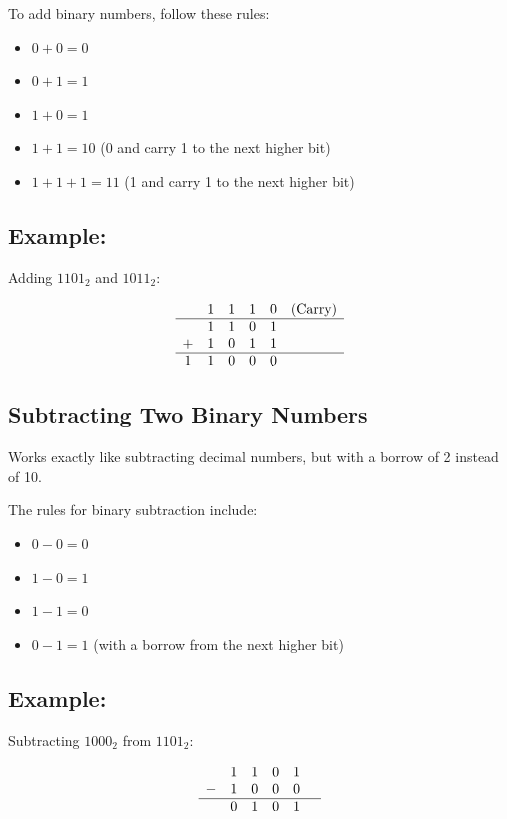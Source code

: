 \documentclass[12pt,openany, tikz,border=10pt]{book}
\begin{document}
	To add binary numbers, follow these rules:
	\begin{itemize}
		\item[] \(0 + 0 = 0\)
		\item[] \(0 + 1 = 1\)
		\item[] \(1 + 0 = 1\)
		\item[] \(1 + 1 = 10\) (0 and carry 1 to the next higher bit)
		\item[] \(1 + 1 + 1 = 11\) (1 and carry 1 to the next higher bit)
	\end{itemize}
	
	\subsection*{Example:}
	
	Adding \(1101_2\) and \(1011_2\):
	
	\[
		\begin{array}{cccccc}
			  & 1 & 1 & 1 & 0 & \text{(Carry)} \\
			\hline
			  & 1 & 1 & 0 & 1 &                \\
			+ & 1 & 0 & 1 & 1 &                \\
			\hline
			1 & 1 & 0 & 0 & 0 &                \\
		\end{array}
	\]
	
	
	\newpage
	\subsection{Subtracting Two Binary Numbers}
	Works exactly like subtracting decimal numbers, but with a borrow of 2 instead of 10.
	
	The rules for binary subtraction include:
	\begin{itemize}
		\item[] \(0 - 0 = 0\)
		\item[] \(1 - 0 = 1\)
		\item[] \(1 - 1 = 0\)
		\item[] \(0 - 1 = 1\) (with a borrow from the next higher bit)
	\end{itemize}
	
	\subsection*{Example:}
	
	Subtracting \(1000_2\) from \(1101_2\):
	
	\[
		\begin{array}{cccccc}
			  & 1 & 1 & 0 & 1 &   \\
			- & 1 & 0 & 0 & 0 &   \\
			\hline
			  & 0 & 1 & 0 & 1 &   \\
		\end{array}
	\]
	
\end{document}
